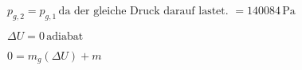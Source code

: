 \( p_{g,2} = p_{g,1} \, \text{da der gleiche Druck darauf lastet.} \)  
\( = 140084 \, \text{Pa} \)  

\( \Delta U = 0 \, \text{adiabat} \)  

\( 0 = m_g (\Delta U) + m \)